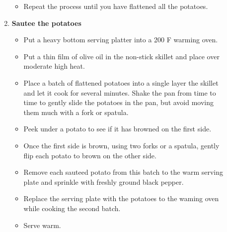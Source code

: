 \documentclass[11pt,letterpaper]{article}
\newcommand \fileName {SaltedPotatoes}
\begin{document}
\begin{description}
\begin{enumerate}
\begin{itemize}
        \item Repeat the process until you have flattened all the potatoes.          
	\end{itemize}
	\item {\bf Sautee the potatoes}
	\begin{itemize}
        \item Put a heavy bottom serving platter into a 200 F warming oven.
	\item Put a thin film of olive oil in the non-stick skillet and place over moderate high heat.
	\item Place a batch of flattened potatoes into a single layer the skillet and let it cook for several minutes. Shake the pan from time to time to gently slide the potatoes in the pan, but avoid moving them much with a fork or spatula.
        \item Peek under a potato to see if it has browned on the first side.
        \item Once the first side is brown, using two forks or a spatula, gently flip each potato to brown on the other side. 
        \item Remove each sauteed potato from this batch to the warm serving plate and sprinkle with freshly ground black pepper.
        \item Replace the serving plate with the potatoes to the waming oven while cooking the second batch.
        \item Serve warm.
	\end{itemize}
	\end{enumerate}
\end{description}

\end{document}
